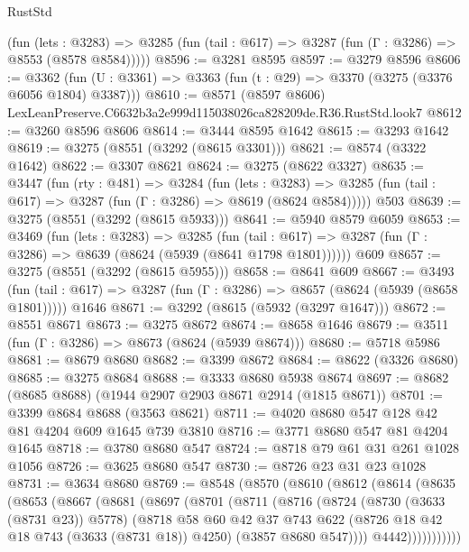 \begin{lexlean}{RustStd}
\begin{coremodule}
      (fun (lets : @3283) =>
      @3285 (fun (tail : @617) => @3287 (fun (Γ : @3286) => @8553 (@8578 @8584)))))
@8596 := @3281 @8595
@8597 := @3279 @8596
@8606 := @3362 (fun (U : @3361) => @3363 (fun (t : @29) => @3370 (@3275 (@3376 @6056 @1804) @3387)))
@8610 := @8571 (@8597 @8606) LexLeanPreserve.C6632b3a2e999d115038026ca828209de.R36.RustStd.look7
@8612 := @3260 @8596 @8606
@8614 := @3444 @8595 @1642
@8615 := @3293 @1642
@8619 := @3275 (@8551 (@3292 (@8615 @3301)))
@8621 := @8574 (@3322 @1642)
@8622 := @3307 @8621
@8624 := @3275 (@8622 @3327)
@8635 := @3447
    (fun (rty : @481) =>
    @3284
      (fun (lets : @3283) =>
      @3285 (fun (tail : @617) => @3287 (fun (Γ : @3286) => @8619 (@8624 @8584)))))
    @503
@8639 := @3275 (@8551 (@3292 (@8615 @5933)))
@8641 := @5940 @8579 @6059
@8653 := @3469
    (fun (lets : @3283) =>
    @3285
      (fun (tail : @617) => @3287 (fun (Γ : @3286) => @8639 (@8624 (@5939 (@8641 @1798 @1801))))))
    @609
@8657 := @3275 (@8551 (@3292 (@8615 @5955)))
@8658 := @8641 @609
@8667 := @3493
    (fun (tail : @617) => @3287 (fun (Γ : @3286) => @8657 (@8624 (@5939 (@8658 @1801)))))
    @1646
@8671 := @3292 (@8615 (@5932 (@3297 @1647)))
@8672 := @8551 @8671
@8673 := @3275 @8672
@8674 := @8658 @1646
@8679 := @3511 (fun (Γ : @3286) => @8673 (@8624 (@5939 @8674)))
@8680 := @5718 @5986
@8681 := @8679 @8680
@8682 := @3399 @8672
@8684 := @8622 (@3326 @8680)
@8685 := @3275 @8684
@8688 := @3333 @8680 @5938 @8674
@8697 := @8682 (@8685 @8688) (@1944 @2907 @2903 @8671 @2914 (@1815 @8671))
@8701 := @3399 @8684 @8688 (@3563 @8621)
@8711 := @4020 @8680 @547 @128 @42 @81 @4204 @609 @1645 @739 @3810
@8716 := @3771 @8680 @547 @81 @4204 @1645
@8718 := @3780 @8680 @547
@8724 := @8718 @79 @61 @31 @261 @1028 @1056
@8726 := @3625 @8680 @547
@8730 := @8726 @23 @31 @23 @1028
@8731 := @3634 @8680
@8769 := @8548
    (@8570
      (@8610
        (@8612
          (@8614
            (@8635
              (@8653
                (@8667
                  (@8681
                    (@8697
                      (@8701
                        (@8711
                          (@8716
                            (@8724
                              (@8730 (@3633 (@8731 @23)) @5778)
                              (@8718
                                @58
                                @60
                                @42
                                @37
                                @743
                                @622
                                (@8726 @18 @42 @18 @743 (@3633 (@8731 @18)) @4250)
                                (@3857 @8680 @547))))
                          @4442)))))))))))

\end{coremodule}
\end{lexlean}
